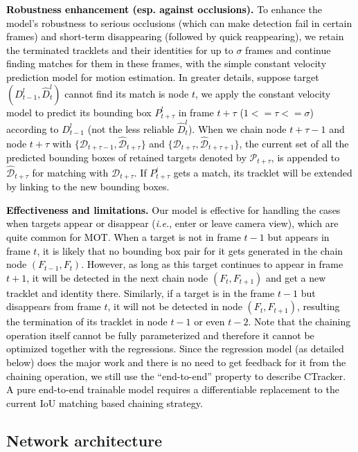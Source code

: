 \documentclass[../arXiv_main.tex]{subfiles}
\newcommand{\CRyang}[1]{\textcolor{black}{#1}}
\begin{document}
\noindent \CRyang{\textbf{Robustness enhancement (esp. against occlusions).} To enhance the model's robustness to serious occlusions (which can make detection fail in certain frames) and short-term disappearing (followed by quick reappearing), we retain the terminated tracklets and their identities for up to $\sigma$ frames and continue finding matches for them in these frames, with the simple constant velocity prediction model \cite{wojke2017simple,peng2020tpm} for motion estimation. In greater details, suppose target $(D_{t-1}^{l},\hat{D}_{t}^{l})$ cannot find its match is node $t$, we apply the constant velocity model to predict its bounding box $P_{t+\tau}^{l}$ in frame $t+\tau$ ($1 <= \tau <= \sigma$) according to $D_{t-1}^{l}$ (not the less reliable $\hat{D}_{t}^{l}$). When we chain node $t+\tau-1$ and node $t+\tau$ with $\{\mathcal{D}_{t+\tau-1},{\mathcal{\hat{D}}_{t+\tau}}\}$ and $\{\mathcal{D}_{t+\tau},{\mathcal{\hat{D}}_{t+\tau+1}}\}$, the current set of all the predicted bounding boxes of retained targets denoted by $\mathcal{P}_{t+\tau}$, is appended to $\mathcal{\hat{D}}_{t+\tau}$ for matching with $\mathcal{D}_{t+\tau}$. If $P_{t+\tau}^{i}$ gets a match, its tracklet will be extended by linking to the new bounding boxes.} 


\noindent \CRyang{\textbf{Effectiveness and limitations.} Our model is effective for handling the cases when targets appear or disappear (\emph{i.e.}, enter or leave camera view), which are quite common for MOT. When a target is not in frame $t-1$ but appears in frame $t$, it is likely that no bounding box pair for it gets generated in the chain node $(F_{t-1}, F_t)$. However, as long as this target continues to appear in frame $t+1$, it will be detected in the next chain node $(F_t, F_{t+1})$ and get a new tracklet and identity there. Similarly, if a target is in the frame $t-1$ but disappears from frame $t$, it will not be detected in node $(F_t, F_{t+1})$, resulting the termination of its tracklet in node $t-1$ or even $t-2$. Note that the chaining operation itself cannot be fully parameterized and therefore it cannot be optimized together with the regressions. Since the regression model (as detailed below) does the major work and there is no need to get feedback for it from the chaining operation, we still use the ``end-to-end'' property to describe CTracker. A pure end-to-end trainable model requires a differentiable replacement to the current IoU matching based chaining strategy.} 



\subsection{Network architecture\label{subsection:network}}
\end{document}

